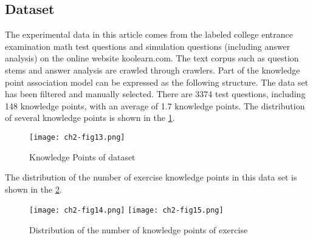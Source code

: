 \subsection{Dataset}
The experimental data in this article comes from the labeled college entrance examination math test questions and simulation questions (including answer analysis) on the online website koolearn.com. The text corpus such as question stems and answer analysis are crawled through crawlers. Part of the knowledge point association model can be expressed as the following structure. The data set has been filtered and manually selected. There are 3374 test questions, including 148 knowledge points, with an average of 1.7 knowledge points. The distribution of several knowledge points is shown in the \figurename{\ref{ch2-fig13}}.
\begin{figure}[H]
	\centering
	\texttt{[image: ch2-fig13.png]}
	\caption{Knowledge Points of dataset}\label{ch2-fig13}
\end{figure}

The distribution of the number of exercise knowledge points in this data set is shown in the \figurename{\ref{ch2-fig14}}.
\begin{figure}[H]
	\centering
	\texttt{[image: ch2-fig14.png]}
	\texttt{[image: ch2-fig15.png]}
	\caption{Distribution of the number of knowledge points of exercise}\label{ch2-fig14}
\end{figure}




